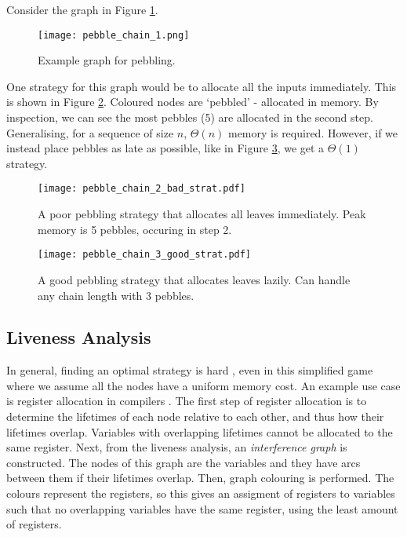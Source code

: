 Consider the graph in Figure \ref{fig:2-chain-to-pebble}.
\begin{figure}[h]
    \centering
    \texttt{[image: pebble\_chain\_1.png]}
    \caption{Example graph for pebbling.}
    \label{fig:2-chain-to-pebble}
\end{figure}

One strategy for this graph would be to allocate all the inputs immediately.
This is shown in Figure \ref{fig:2-pebble-chain-bad}.
Coloured nodes are `pebbled' - allocated in memory.
By inspection, we can see the most pebbles (5) are allocated in the second step.
Generalising, for a sequence of size \(n\), \(\Theta(n)\) memory is required.
However, if we instead place pebbles as late as possible, like in Figure \ref{fig:2-pebble-chain-good}, we get a \(\Theta(1)\) strategy.
\clearpage
\begin{figure}[h]
    \centering
    \texttt{[image: pebble\_chain\_2\_bad\_strat.pdf]}
    \caption{A poor pebbling strategy that allocates all leaves immediately. Peak memory is 5 pebbles, occuring in step 2.}
    \label{fig:2-pebble-chain-bad}
\end{figure}
\begin{figure}[H]
    \centering
    \texttt{[image: pebble\_chain\_3\_good\_strat.pdf]}
    \caption{A good pebbling strategy that allocates leaves lazily. Can handle any chain length with 3 pebbles.}
    \label{fig:2-pebble-chain-good}
\end{figure}

\subsection{Liveness Analysis}
In general, finding an optimal strategy is hard \cite{Austrin2011}, even in this simplified game where we assume all the nodes have a uniform memory cost.
An example use case is register allocation in compilers \cite{Chaitin1982}.
The first step of register allocation is to determine the lifetimes of each node relative to each other, and thus how their lifetimes overlap.
Variables with overlapping lifetimes cannot be allocated to the same register.
Next, from the liveness analysis, an \textit{interference graph} is constructed.
The nodes of this graph are the variables and they have arcs between them if their lifetimes overlap.
Then, graph colouring is performed.
The colours represent the registers, so this gives an assigment of registers to variables such that no overlapping variables have the same register, using the least amount of registers.

